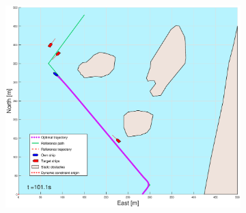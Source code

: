 \begin{figure}[!ht]
\begin{subfigure}[b]{0.49\textwidth}
    \end{subfigure}
    \hfill
    \begin{subfigure}[b]{0.499\textwidth}
        \centering
        \includegraphics[width=\textwidth]{Images/Figures/Helloya_Rev/_Simple_0fig999_time=101}
    \end{subfigure}
    \hfill
\end{figure}%

